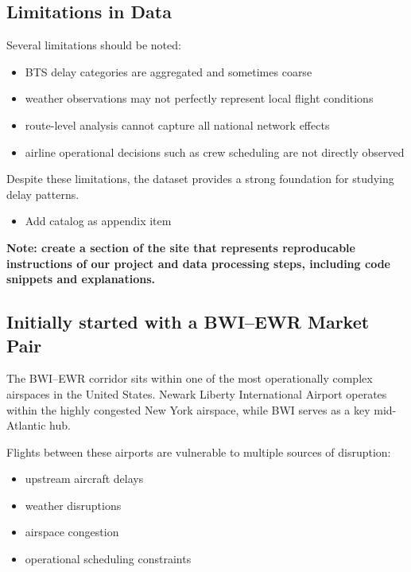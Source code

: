 \documentclass[
  letterpaper,
  DIV=11,
  numbers=noendperiod]{scrartcl}
\providecommand{\tightlist}{%
  \setlength{\itemsep}{0pt}\setlength{\parskip}{0pt}}
\begin{document}
\subsection{Limitations in Data}\label{limitations-in-data}

Several limitations should be noted:

\begin{itemize}
\tightlist
\item
  BTS delay categories are aggregated and sometimes coarse
\item
  weather observations may not perfectly represent local flight
  conditions
\item
  route-level analysis cannot capture all national network effects
\item
  airline operational decisions such as crew scheduling are not directly
  observed
\end{itemize}

Despite these limitations, the dataset provides a strong foundation for
studying delay patterns.

\begin{itemize}
\tightlist
\item
  Add catalog as appendix item
\end{itemize}

\textbf{Note: create a section of the site that represents reproducable
instructions of our project and data processing steps, including code
snippets and explanations.}

\subsection{Initially started with a BWI--EWR Market
Pair}\label{initially-started-with-a-bwiewr-market-pair}

The BWI--EWR corridor sits within one of the most operationally complex
airspaces in the United States. Newark Liberty International Airport
operates within the highly congested New York airspace, while BWI serves
as a key mid-Atlantic hub.

Flights between these airports are vulnerable to multiple sources of
disruption:

\begin{itemize}
\tightlist
\item
  upstream aircraft delays
\item
  weather disruptions
\item
  airspace congestion
\item
  operational scheduling constraints
\end{itemize}
\end{document}
